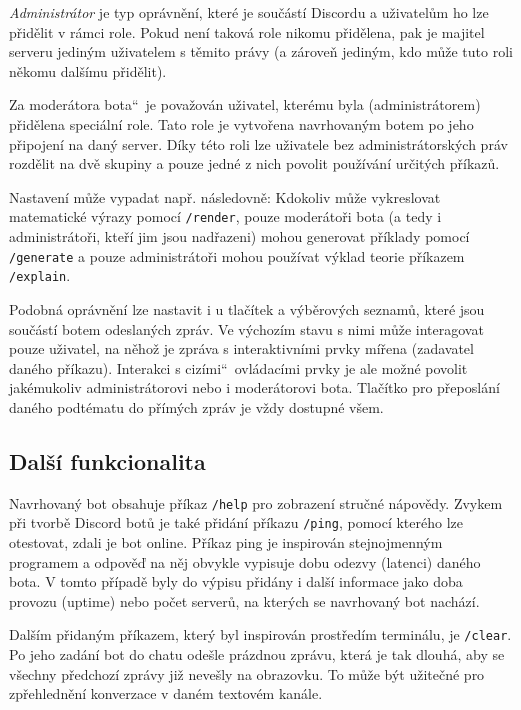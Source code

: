 \documentclass[FM]{tulthesis}
\begin{document}
	\textit{Administrátor} je typ oprávnění, které je součástí Discordu a uživatelům ho lze přidělit v rámci role. Pokud není taková role nikomu přidělena, pak je majitel serveru jediným uživatelem s těmito právy (a zároveň jediným, kdo může tuto roli někomu dalšímu přidělit).
	
	Za \quotedblbase moderátora bota\textquotedblleft\ je považován uživatel, kterému byla (administrátorem) přidělena speciální role. Tato role je vytvořena navrhovaným botem po jeho připojení na daný server. Díky této roli lze uživatele bez administrátorských práv rozdělit na dvě skupiny a pouze jedné z nich povolit používání určitých příkazů.
	
	Nastavení může vypadat např. následovně: Kdokoliv může vykreslovat matematické výrazy pomocí \verb*|/render|, pouze moderátoři bota (a tedy i administrátoři, kteří jim jsou nadřazeni) mohou generovat příklady pomocí \verb*|/generate| a pouze administrátoři mohou používat výklad teorie příkazem \verb*|/explain|.
	
	Podobná oprávnění lze nastavit i u tlačítek a výběrových seznamů, které jsou součástí botem odeslaných zpráv. Ve výchozím stavu s nimi může interagovat pouze uživatel, na něhož je zpráva s interaktivními prvky mířena (zadavatel daného příkazu). Interakci s \quotedblbase cizími\textquotedblleft\ ovládacími prvky je ale možné povolit jakémukoliv administrátorovi nebo i moderátorovi bota. Tlačítko pro přeposlání daného podtématu do přímých zpráv je vždy dostupné všem.
	
	\subsection{Další funkcionalita} %
	
	Navrhovaný bot obsahuje příkaz \verb*|/help| pro zobrazení stručné nápovědy. Zvykem při tvorbě Discord botů je také přidání příkazu \verb*|/ping|, pomocí kterého lze otestovat, zdali je bot online. Příkaz ping je inspirován stejnojmenným programem a odpověď na něj obvykle vypisuje dobu odezvy (latenci) daného bota. V tomto případě byly do výpisu přidány i další informace jako doba provozu (uptime) nebo počet serverů, na kterých se navrhovaný bot nachází.
	
	Dalším přidaným příkazem, který byl inspirován prostředím terminálu, je \verb*|/clear|. Po jeho zadání bot do chatu odešle  prázdnou zprávu, která je tak dlouhá, aby se všechny předchozí zprávy již nevešly na obrazovku. To může být užitečné pro zpřehlednění konverzace v daném textovém kanále.
	
\end{document}
